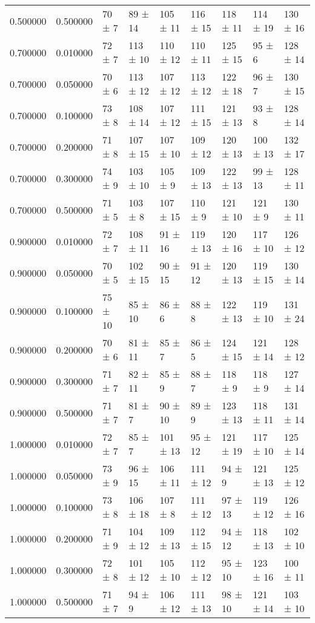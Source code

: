 \begin{table}
\begin{tabular}{rrlllllll}
0.500000 & 0.500000 & 70 ± 7 & 89 ± 14 & 105 ± 11 & 116 ± 15 & 118 ± 11 & 114 ± 19 & 130 ± 16 \\
0.700000 & 0.010000 & 72 ± 7 & 113 ± 10 & 110 ± 12 & 110 ± 11 & 125 ± 15 & 95 ± 6 & 128 ± 14 \\
0.700000 & 0.050000 & 70 ± 6 & 113 ± 12 & 107 ± 12 & 113 ± 12 & 122 ± 18 & 96 ± 7 & 130 ± 15 \\
0.700000 & 0.100000 & 73 ± 8 & 108 ± 14 & 107 ± 12 & 111 ± 15 & 121 ± 13 & 93 ± 8 & 128 ± 14 \\
0.700000 & 0.200000 & 71 ± 8 & 107 ± 15 & 107 ± 10 & 109 ± 12 & 120 ± 13 & 100 ± 13 & 132 ± 17 \\
0.700000 & 0.300000 & 74 ± 9 & 103 ± 10 & 105 ± 9 & 109 ± 13 & 122 ± 13 & 99 ± 13 & 128 ± 11 \\
0.700000 & 0.500000 & 71 ± 5 & 103 ± 8 & 107 ± 15 & 110 ± 9 & 121 ± 10 & 121 ± 9 & 130 ± 11 \\
0.900000 & 0.010000 & 72 ± 7 & 108 ± 11 & 91 ± 16 & 119 ± 13 & 120 ± 16 & 117 ± 10 & 126 ± 12 \\
0.900000 & 0.050000 & 70 ± 5 & 102 ± 15 & 90 ± 15 & 91 ± 12 & 120 ± 13 & 119 ± 15 & 130 ± 14 \\
0.900000 & 0.100000 & 75 ± 10 & 85 ± 10 & 86 ± 6 & 88 ± 8 & 122 ± 13 & 119 ± 10 & 131 ± 24 \\
0.900000 & 0.200000 & 70 ± 6 & 81 ± 11 & 85 ± 7 & 86 ± 5 & 124 ± 15 & 121 ± 14 & 128 ± 12 \\
0.900000 & 0.300000 & 71 ± 7 & 82 ± 11 & 85 ± 9 & 88 ± 7 & 118 ± 9 & 118 ± 9 & 127 ± 14 \\
0.900000 & 0.500000 & 71 ± 7 & 81 ± 7 & 90 ± 10 & 89 ± 9 & 123 ± 13 & 118 ± 11 & 131 ± 14 \\
1.000000 & 0.010000 & 72 ± 7 & 85 ± 7 & 101 ± 13 & 95 ± 12 & 121 ± 19 & 117 ± 10 & 125 ± 14 \\
1.000000 & 0.050000 & 73 ± 9 & 96 ± 15 & 106 ± 11 & 111 ± 12 & 94 ± 9 & 121 ± 13 & 125 ± 12 \\
1.000000 & 0.100000 & 73 ± 8 & 106 ± 18 & 107 ± 8 & 111 ± 12 & 97 ± 13 & 119 ± 12 & 126 ± 16 \\
1.000000 & 0.200000 & 71 ± 9 & 104 ± 12 & 109 ± 13 & 112 ± 15 & 94 ± 12 & 118 ± 13 & 102 ± 10 \\
1.000000 & 0.300000 & 72 ± 8 & 101 ± 12 & 105 ± 10 & 112 ± 12 & 95 ± 10 & 123 ± 16 & 100 ± 11 \\
1.000000 & 0.500000 & 71 ± 7 & 94 ± 9 & 106 ± 12 & 111 ± 13 & 98 ± 10 & 121 ± 14 & 103 ± 10 \\
\bottomrule
\end{tabular}
\end{table}
